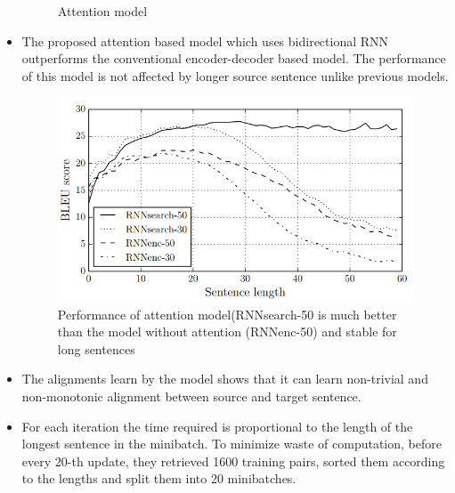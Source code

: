 \documentclass{article}
\begin{document}
\begin{itemize}
\begin{figure}[H]
        \caption{Attention model}
        \label{fig:Figure 1}
    \end{figure}
    \item The proposed attention based model which uses bidirectional RNN outperforms the conventional encoder-decoder based model. The performance of this model is not affected by longer source sentence unlike previous models.
     \begin{figure}[H]
        \centering
        \includegraphics[scale=0.45]{performance.png}
        \caption{Performance of attention model(RNNsearch-50 is much better than the model without attention (RNNenc-50) and stable for long sentences}
        \label{fig:Figure 1}
    \end{figure}   
    \item The alignments learn by the model shows that it can learn non-trivial and non-monotonic alignment between source and target sentence.
    \item For each iteration the time required is proportional to the length of the longest sentence in the minibatch. To minimize waste of computation, before every 20-th update, they retrieved 1600 training pairs, sorted them according to the lengths and split them into 20 minibatches.  

    
\end{itemize}
\end{document}
